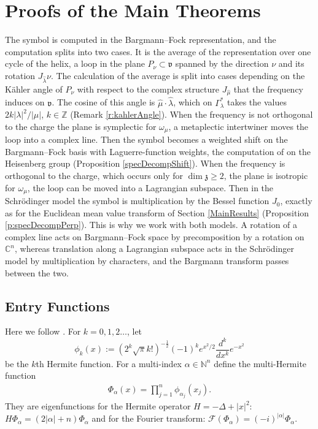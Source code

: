 \documentclass[11pt]{amsart}
\theoremstyle{plain}
\theoremstyle{definition}
\theoremstyle{remark}
\numberwithin{equation}{section}
\def\fz{\mathfrak{z}}
\def\fv{\mathfrak{v}}
\def\C{{\mathbb C}}%
\def\N{{\mathbb N}}%
\def\Z{{\mathbb Z}}%
\numberwithin{equation}{section}
\begin{document}
\section{Proofs of the Main Theorems}\label{s:proofs}
The symbol is computed in the Bargmann--Fock representation, and the computation splits into two cases. It is the average of the representation over one cycle of the helix, a loop in the plane $P_\nu\subset\fv$ spanned by the direction $\nu$ and its rotation $J_{\hat\lambda}\nu$. The calculation of the average is split into cases depending on the K\"{a}hler angle of $P_\nu$ with respect to the complex structure $J_{\hat\mu}$ that the frequency induces on $\fv$. The cosine of this angle is $\hat\mu\cdot\hat\lambda$, which on $\Gamma_\lambda^*$ takes the values $2k|\lambda|^2/|\mu|$, $k\in \Z$ (Remark \ref{r:kahlerAngle}). When the frequency is not orthogonal to the charge the plane is symplectic for $\omega_\mu$, a metaplectic intertwiner moves the loop into a complex line. Then the symbol becomes a weighted shift on the Bargmann--Fock basis with Laguerre-function weights, the computation of \cite{flynnInjectivityHeisenbergXray2021} on the Heisenberg group (Proposition \ref{specDecompShift}). When the frequency is orthogonal to the charge, which occurs only for $\dim\fz\geq2$, the plane is isotropic for $\omega_\mu$, the loop can be moved into a Lagrangian subspace. Then in the Schr\"{o}dinger model the symbol is multiplication by the Bessel function $J_0$, exactly as for the Euclidean mean value transform of Section \ref{MainResults} (Proposition \ref{p:specDecompPerp}). This is why we work with both models. A rotation of a complex line acts on Bargmann--Fock space by precomposition by a rotation on $\C^n$, whereas translation along a Lagrangian subspace acts in the Schr\"{o}dinger model by multiplication by characters, and the Bargmann transform passes between the two.

\subsection{Entry Functions}
Here we follow \cite[page 18]{thangaveluHarmonicAnalysisHeisenberg1998}.
For $k=0, 1, 2 \ldots $, let $$\phi_k(x):=(2^k\sqrt{\pi}k!)^{-\frac{1}{2}}(-1)^ke^{x^2/2}\frac{d^k}{dx^k}e^{-x^2}$$
be the $k$th Hermite function. For a multi-index $\alpha\in \N^n$ define the multi-Hermite function
\begin{align*}
	\Phi_\alpha(x)=\prod_{j=1}^n\phi_{\alpha_j}(x_j).
\end{align*}
They are eigenfunctions for the Hermite operator $H=-\Delta+|x|^2$:  $H\Phi_\alpha=(2|\alpha|+n)\Phi_\alpha$ and for the Fourier transform: $\mathcal{F}(\Phi_\alpha)=(-i)^{|\alpha|}\Phi_\alpha$. 
\end{document}
